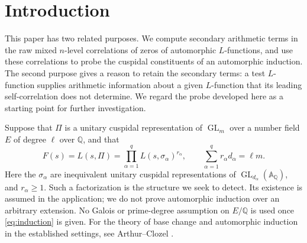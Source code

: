 \documentclass[11pt]{article}
\numberwithin{equation}{section}
\theoremstyle{remark}
\newcommand{\Q}{\mathbb Q}
\newcommand{\GL}{\operatorname{GL}}
\begin{document}
\clearpage\begingroup\small\tableofcontents\endgroup\clearpage
\section{Introduction}

This paper has two related purposes. We compute secondary arithmetic
terms in the raw mixed $n$-level correlations of zeros of automorphic
$L$-functions, and use these correlations to probe the cuspidal
constituents of an automorphic induction. The second purpose gives a
reason to retain the secondary terms: a test $L$-function supplies
arithmetic information about a given $L$-function that its leading
self-correlation does not determine. We regard the probe developed
here as a starting point for further investigation.

Suppose that $\Pi$ is a unitary cuspidal representation of $\GL_m$ over
a number field $E$ of degree $\ell$ over $\Q$, and that
\begin{equation}\label{eq:induction}
 F(s)=L(s,\Pi)=\prod_{\alpha=1}^q
 L(s,\sigma_\alpha)^{r_\alpha},
 \qquad \sum_{\alpha=1}^q r_\alpha d_\alpha=\ell m.
\end{equation}
Here the $\sigma_\alpha$ are inequivalent unitary cuspidal
representations of $\GL_{d_\alpha}(\mathbb A_\Q)$, and
$r_\alpha\ge1$. Such a factorization is the structure we seek to
detect. Its existence is assumed in the application; we do not prove
automorphic induction over an arbitrary extension. No Galois or
prime-degree assumption on $E/\Q$ is used once
\eqref{eq:induction} is given. For the theory of base change and
automorphic induction in the established settings, see
Arthur--Clozel \cite{AC}.
\end{document}
